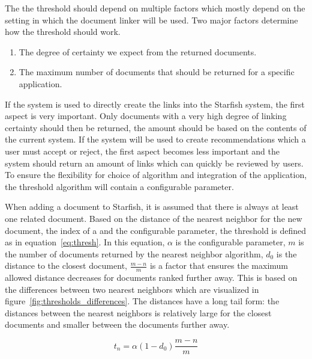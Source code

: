 The the threshold should depend on multiple factors which mostly depend on the setting in which the document linker will be used. Two major factors determine how the threshold should work.
\begin{enumerate}[1.]
	\item The degree of certainty we expect from the returned documents.
	\item The maximum number of documents that should be returned for a specific application.
\end{enumerate}
If the system is used to directly create the links into the Starfish system, the first aspect is very important. Only documents with a very high degree of linking certainty should then be returned, the amount should be based on the contents of the current system. If the system will be used to create recommendations which a user must accept or reject, the first aspect becomes less important and the system should return an amount of links which can quickly be reviewed by users. To ensure the flexibility for choice of algorithm and integration of the application, the threshold algorithm will contain a configurable parameter.

When adding a document to Starfish, it is assumed that there is always at least one related document. Based on the distance of the nearest neighbor for the new document, the index of a and the configurable parameter, the threshold is defined as in equation~\ref{eq:thresh}. In this equation, $\alpha$ is the configurable parameter, $m$ is the number of documents returned by the nearest neighbor algorithm, $d_0$ is the distance to the closest document, $\frac{m - n}{m}$ is a factor that ensures the maximum allowed distance decreases for documents ranked further away. This is based on the differences between two nearest neighbors which are visualized in figure~\ref{fig:thresholds_differences}. The distances have a long tail form: the distances between the nearest neighbors is relatively large for the closest documents and smaller between the documents further away. 

\begin{equation}
t_n = \alpha (1 - d_0) \frac{m - n}{m}
\label{eq:thresh}
\end{equation}
